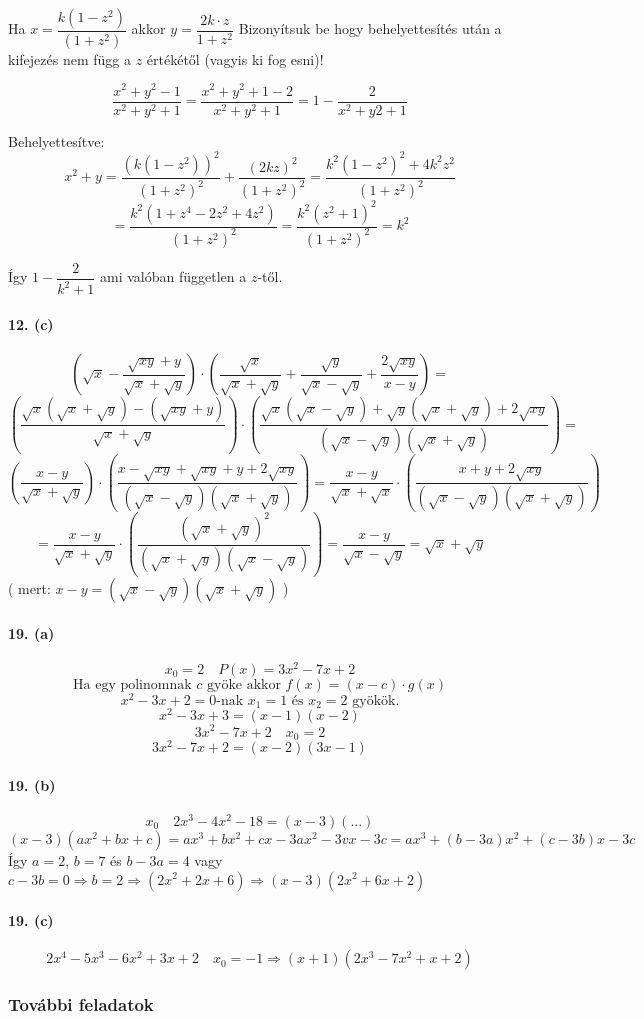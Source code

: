 \documentclass[12pt,a4paper,fleqn]{article}
\newcommand{\myparagraph}[1]{\paragraph{#1}\mbox{}}
\begin{document}
Ha $x = \dfrac{k(1-z^2)}{(1+z^2)}$ akkor $y = \dfrac{2k \cdot z}{1+z^2}$
Bizonyítsuk be hogy behelyettesítés után a kifejezés nem függ a $z$ értékétől
(vagyis ki fog esni)!

\[ \dfrac{x^2+y^2-1}{x^2+y^2+1} = \dfrac{x^2+y^2+1-2}{x^2+y^2+1} =
  1 - \dfrac{2}{x^2+y2+1} \]

Behelyettesítve:
\[ x^2+y=\dfrac{(k(1-z^2))^2}{(1+z^2)^2} + \dfrac{(2kz)^2}{(1+z^2)^2} =
  \dfrac{k^2(1-z^2)^2+4k^2z^2}{(1+z^2)^2} \]
\[ = \dfrac{k^2(1+z^4-2z^2+4z^2)}{(1+z^2)^2} = \dfrac{k^2(z^2+1)^2}{(1+z^2)^2}
  = k^2 \]

Így $1-\dfrac{2}{k^2+1}$ ami valóban független a $z$-től.


\myparagraph{12. (c)}
\[ \left(\sqrt{x} - \dfrac{\sqrt{xy}+y}{\sqrt{x}+\sqrt{y}}\right) \cdot
  \left( \dfrac{\sqrt{x}}{\sqrt{x}+\sqrt{y}} + \dfrac{\sqrt{y}}{\sqrt{x}-
  \sqrt{y}} + \dfrac{2\sqrt{xy}}{x-y} \right) = \]
\[
  \left(\dfrac{\sqrt{x}(\sqrt{x}+\sqrt{y})-(\sqrt{xy}+y)}{\sqrt{x} + \sqrt{y}}
  \right) \cdot \left( \dfrac{\sqrt{x}(\sqrt{x}-\sqrt{y})+
    \sqrt{y}(\sqrt{x}+\sqrt{y})+2\sqrt{xy}}{(\sqrt{x}-\sqrt{y})
    (\sqrt{x}+\sqrt{y})} \right) =
\]
\[ \left( \dfrac{x-y}{\sqrt{x}+\sqrt{y}} \right) \cdot \left(
  \dfrac{x-\sqrt{xy}+\sqrt{xy}+y+2\sqrt{xy}}{(\sqrt{x}-\sqrt{y})
  (\sqrt{x}+\sqrt{y})} \right) =
  \dfrac{x-y}{\sqrt{x}+\sqrt{x}} \cdot \left( \dfrac{x+y+2\sqrt{xy}}{(\sqrt{x}-
  \sqrt{y})(\sqrt{x}+\sqrt{y})} \right) \]
\[ = \dfrac{x-y}{\sqrt{x}+\sqrt{y}} \cdot \left(
  \dfrac{(\sqrt{x}+\sqrt{y})^2}{(\sqrt{x}+\sqrt{y})(\sqrt{x}-\sqrt{y})} \right) =
  \dfrac{x-y}{\sqrt{x} - \sqrt{y}} = \sqrt{x} + \sqrt{y} \]
( mert: $x-y=(\sqrt{x}-\sqrt{y})(\sqrt{x}+\sqrt{y})$ )


\myparagraph{19. (a)}
\[ x_0 = 2 \quad P(x)=3x^2 - 7x + 2 \]
\[ \text{Ha egy polinomnak } c \text{ gyöke akkor } f(x)=(x-c) \cdot g(x) \]
\[ x^2-3x+2=0\text{-nak } x_1=1 \text{ és } x_2=2 \text{ gyökök.} \]
\[ x^2-3x+3=(x-1)(x-2) \]
\[ 3x^2-7x+2 \quad x_0=2 \]
\[ 3x^2-7x+2=(x-2)(3x-1) \]


\myparagraph{19. (b)}
\[ x_0 \quad 2x^3-4x^2-18 = (x-3)(...) \]
\[ (x-3)(ax^2+bx+c) = ax^3+bx^2+cx-3ax^2-3vx-3c = ax^3+(b-3a)x^2+(c-3b)x-3c \]
Így $a=2$, $b=7$ és $b-3a=4$ vagy $c-3b=0 \Rightarrow b=2 \Longrightarrow
  (2x^2+2x+6) \Rightarrow (x-3)(2x^2+6x+2)$


\myparagraph{19. (c)}
\[ 2x^4-5x^3-6x^2+3x+2 \quad x_0=-1 \Longrightarrow (x+1)(2x^3-7x^2+x+2) \]

\subsubsection{További feladatok}
\end{document}
